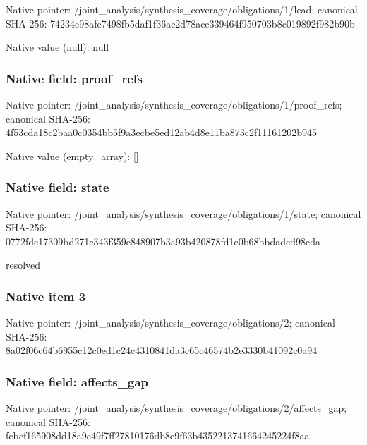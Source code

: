 \documentclass[10pt,a4paper]{article}
\begin{document}
Native pointer: /joint\_analysis/synthesi\allowbreak{}s\_coverage/obligations/1\allowbreak{}/lead; canonical SHA-256: 74234e98afe7498fb5daf1f3\allowbreak{}6ac2d78acc339464f950703b\allowbreak{}8c019892f982b90b



Native value (null): null



\subsubsection{Native field: proof\_refs}


Native pointer: /joint\_analysis/synthesi\allowbreak{}s\_coverage/obligations/1\allowbreak{}/proof\_refs; canonical SHA-256: 4f53cda18c2baa0c0354bb5f\allowbreak{}9a3ecbe5ed12ab4d8e11ba87\allowbreak{}3c2f11161202b945



Native value (empty\_array): []



\subsubsection{Native field: state}


Native pointer: /joint\_analysis/synthesi\allowbreak{}s\_coverage/obligations/1\allowbreak{}/state; canonical SHA-256: 0772fde17309bd271c343f35\allowbreak{}9e848907b3a93b420878fd1e\allowbreak{}0b68bbdadcd98eda


resolved


\subsubsection{Native item 3}


Native pointer: /joint\_analysis/synthesi\allowbreak{}s\_coverage/obligations/2; canonical SHA-256: 8a02f06c64b6955c12c0ed1c\allowbreak{}24c4310841da3c65c46574b2\allowbreak{}e3330b41092c0a94



\subsubsection{Native field: affects\_gap}


Native pointer: /joint\_analysis/synthesi\allowbreak{}s\_coverage/obligations/2\allowbreak{}/affects\_gap; canonical SHA-256: fcbcf165908dd18a9e49f7ff\allowbreak{}27810176db8e9f63b4352213\allowbreak{}741664245224f8aa
\end{document}
